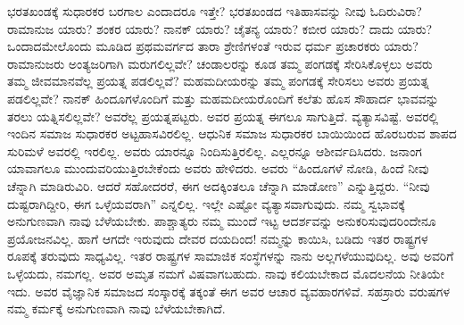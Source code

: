 ಭರತಖಂಡಕ್ಕೆ ಸುಧಾರಕರ ಬರಗಾಲ ಎಂದಾದರೂ ಇತ್ತೇ? ಭರತಖಂಡದ ಇತಿಹಾಸವನ್ನು ನೀವು ಓದಿರುವಿರಾ? ರಾಮಾನುಜ ಯಾರು? ಶಂಕರ ಯಾರು? ನಾನಕ್​ ಯಾರು? ಚೈತನ್ಯ ಯಾರು? ಕಬೀರ ಯಾರು? ದಾದು ಯಾರು? ಒಂದಾದಮೇಲೊಂದು ಮೂಡಿದ ಪ್ರಥಮವರ್ಗದ ತಾರಾ ಶ್ರೇಣಿಗಳಂತೆ ಇರುವ ಧರ್ಮ ಪ್ರಚಾರಕರು ಯಾರು? ರಾಮಾನುಜರು ಅಂತ್ಯಜರಿಗಾಗಿ ಮರುಗಲಿಲ್ಲವೇ? ಚಂಡಾಲರನ್ನು ಕೂಡ ತಮ್ಮ ಪಂಗಡಕ್ಕೆ ಸೇರಿಸಿಕೊಳ್ಳಲು ಅವರು ತಮ್ಮ ಜೀವಮಾನವೆಲ್ಲ ಪ್ರಯತ್ನ ಪಡಲಿಲ್ಲವೆ? ಮಹಮದೀಯರನ್ನು ತಮ್ಮ ಪಂಗಡಕ್ಕೆ ಸೇರಿಸಲು ಅವರು ಪ್ರಯತ್ನ ಪಡಲಿಲ್ಲವೇ? ನಾನಕ್​ ಹಿಂದೂಗಳೊಂದಿಗೆ ಮತ್ತು ಮಹಮದೀಯರೊಂದಿಗೆ ಕಲೆತು ಹೊಸ ಸೌಹಾರ್ದ ಭಾವವನ್ನು ತರಲು ಯತ್ನಿಸಲಿಲ್ಲವೇ? ಅವರೆಲ್ಲ ಪ್ರಯತ್ನಪಟ್ಟರು. ಅವರ ಪ್ರಯತ್ನ ಈಗಲೂ ಸಾಗುತ್ತಿದೆ. ವ್ಯತ್ಯಾಸವಿಷ್ಟೆ. ಅವರಲ್ಲಿ ಇಂದಿನ ಸಮಾಜ ಸುಧಾರಕರ ಅಟ್ಟಹಾಸವಿರಲಿಲ್ಲ. ಆಧುನಿಕ ಸಮಾಜ ಸುಧಾರಕರ ಬಾಯಿಯಿಂದ ಹೊರಬರುವ ಶಾಪದ ಸುರಿಮಳೆ ಅವರಲ್ಲಿ ಇರಲಿಲ್ಲ. ಅವರು ಯಾರನ್ನೂ ನಿಂದಿಸುತ್ತಿರಲಿಲ್ಲ. ಎಲ್ಲರನ್ನೂ ಆಶೀರ್ವದಿಸಿದರು. ಜನಾಂಗ ಯಾವಾಗಲೂ ಮುಂದುವರಿಯುತ್ತಿರಬೇಕೆಂದು ಅವರು ಹೇಳಿದರು. ಅವರು “ಹಿಂದೂಗಳೆ ನೋಡಿ, ಹಿಂದೆ ನೀವು ಚೆನ್ನಾಗಿ ಮಾಡಿರುವಿರಿ. ಆದರೆ ಸಹೋದರರೆ, ಈಗ ಅದಕ್ಕಿಂತಲೂ ಚೆನ್ನಾಗಿ ಮಾಡೋಣ” ಎನ್ನುತ್ತಿದ್ದರು. “ನೀವು ದುಷ್ಟರಾಗಿದ್ದೀರಿ, ಈಗ ಒಳ್ಳೆಯವರಾಗಿ” ಎನ್ನಲಿಲ್ಲ. ಇಲ್ಲೇ ಎಷ್ಟೋ ವ್ಯತ್ಯಾಸವಾಗುವುದು. ನಮ್ಮ ಸ್ವಭಾವಕ್ಕೆ ಅನುಗುಣವಾಗಿ ನಾವು ಬೆಳೆಯಬೇಕು. ಪಾಶ್ಚಾತ್ಯರು ನಮ್ಮ ಮುಂದೆ ಇಟ್ಟ ಆದರ್ಶವನ್ನು ಅನುಕರಿಸುವುದರಿಂದೇನೂ ಪ್ರಯೋಜನವಿಲ್ಲ. ಹಾಗೆ ಆಗದೇ ಇರುವುದು ದೇವರ ದಯದಿಂದ! ನಮ್ಮನ್ನು ಕಾಯಿಸಿ, ಬಡಿದು ಇತರ ರಾಷ್ಟ್ರಗಳ ರೂಪಕ್ಕೆ ತರುವುದು ಸಾಧ್ಯವಿಲ್ಲ. ಇತರ ರಾಷ್ಟ್ರಗಳ ಸಾಮಾಜಿಕ ಸಂಸ್ಥೆಗಳನ್ನು ನಾನು ಅಲ್ಲಗಳೆಯುವುದಿಲ್ಲ. ಅವು ಅವರಿಗೆ ಒಳ್ಳೆಯದು, ನಮಗಲ್ಲ. ಅವರ ಅಮೃತ ನಮಗೆ ವಿಷವಾಗಬಹುದು. ನಾವು ಕಲಿಯಬೇಕಾದ ಮೊದಲನೆಯ ನೀತಿಯೇ ಇದು. ಅವರ ವೈಜ್ಞಾನಿಕ ಸಮಾಜದ ಸಂಸ್ಕಾರಕ್ಕೆ ತಕ್ಕಂತೆ ಈಗ ಅವರ ಆಚಾರ ವ್ಯವಹಾರಗಳಿವೆ. ಸಹಸ್ರಾರು ವರುಷಗಳ ನಮ್ಮ ಕರ್ಮಕ್ಕೆ ಅನುಗುಣವಾಗಿ ನಾವು ಬೆಳೆಯಬೇಕಾಗಿದೆ.

